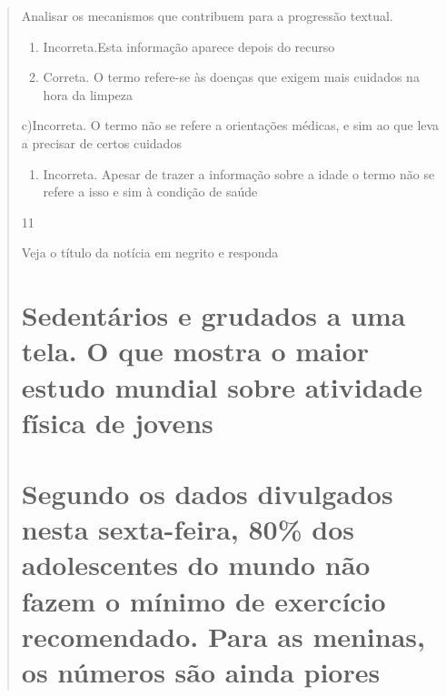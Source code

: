 {\begin{quote}
{\begin{itemize}
\begin{itemize}
Analisar os mecanismos que contribuem para a progressão textual.

\begin{enumerate}
\def\labelenumi{\arabic{enumi}.}
\item
  Incorreta.Esta informação aparece depois do recurso
\item
  Correta. O termo refere-se às doenças que exigem mais cuidados na hora
  da limpeza
\end{enumerate}

c)Incorreta. O termo não se refere a orientações médicas, e sim ao que
leva a precisar de certos cuidados

\begin{enumerate}
\def\labelenumi{\arabic{enumi}.}
\tightlist
\item
  Incorreta. Apesar de trazer a informação sobre a idade o termo não se
  refere a isso e sim à condição de saúde
\end{enumerate}

\num{11}

Veja o título da notícia em negrito e responda

\hypertarget{sedentuxe1rios-e-grudados-a-uma-tela.-o-que-mostra-o-maior-estudo-mundial-sobre-atividade-fuxedsica-de-jovens}{%
\section{\texorpdfstring{\textbf{Sedentários e grudados a uma tela. O
que mostra o maior estudo mundial sobre atividade física de
jovens}}{Sedentários e grudados a uma tela. O que mostra o maior estudo mundial sobre atividade física de jovens}}\label{sedentuxe1rios-e-grudados-a-uma-tela.-o-que-mostra-o-maior-estudo-mundial-sobre-atividade-fuxedsica-de-jovens}}

\hypertarget{segundo-os-dados-divulgados-nesta-sexta-feira-80-dos-adolescentes-do-mundo-nuxe3o-fazem-o-muxednimo-de-exercuxedcio-recomendado.-para-as-meninas-os-nuxfameros-suxe3o-ainda-piores}{%
\section{Segundo os dados divulgados nesta sexta-feira, 80\% dos
adolescentes do mundo não fazem o mínimo de exercício recomendado. Para
as meninas, os números são ainda
piores}\label{segundo-os-dados-divulgados-nesta-sexta-feira-80-dos-adolescentes-do-mundo-nuxe3o-fazem-o-muxednimo-de-exercuxedcio-recomendado.-para-as-meninas-os-nuxfameros-suxe3o-ainda-piores}}


\end{itemize}
\end{itemize}}
\end{quote}}
